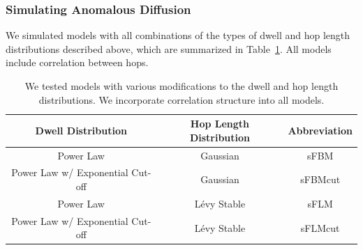 \documentclass{article}
\begin{document}
  \subsubsection*{Simulating Anomalous Diffusion}

  We simulated models with all combinations of 
  the types of 
  dwell and hop length distributions
  described above, which are summarized in Table~\ref{table:anomalous_models}. All models 
  include correlation between hops.
  \begin{table}[!htb]
	  \centering
	  \begin{tabular}{|c|c|c|}
	  \hline
	  Dwell Distribution                & Hop Length Distribution & Abbreviation \\
	  \hline
      Power Law                         & Gaussian                & sFBM         \\
      Power Law w/ Exponential Cut-off  & Gaussian                & sFBMcut      \\
      Power Law                         & L\'evy Stable           & sFLM         \\
      Power Law w/ Exponential Cut-off  & L\'evy Stable           & sFLMcut      \\
	  \hline
	  \end{tabular}
	  \caption{We tested models with various modifications to the dwell and hop
	  length distributions. We incorporate correlation structure into all models.}\label{table:anomalous_models}
 \end{table}
\end{document}
